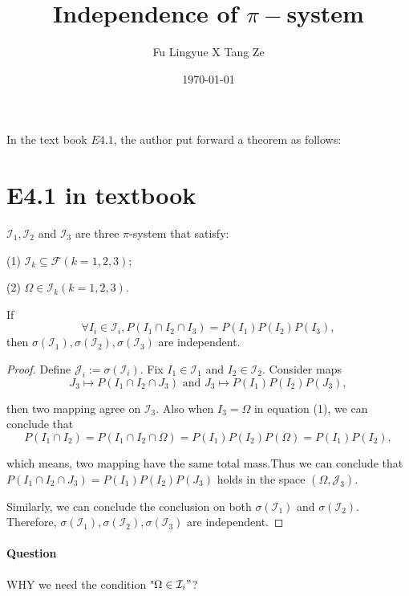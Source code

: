 

\title{Independence of $\pi-$system}
\author{Fu Lingyue X Tang Ze}
\date{\today}


\maketitle
In the text book $E4.1$, the author put forward a theorem as follows:
\section{E4.1 in textbook}
\begin{theorem}
  $\mathcal I_1,\mathcal I_2$ and $\mathcal I_3$ are three $\pi$-system that satisfy:
  
  (1) $\mathcal I_k\subseteq \mathcal F(k=1,2,3);$
  
  (2) $\Omega\in \mathcal I_k(k = 1,2,3).$
  
  If 
  \begin{equation}
    \forall I_i \in \mathcal I_i,P(I_1 \cap I_2\cap I_3) = P(I_1)P(I_2)P(I_3),
  \end{equation}
 then $\sigma(\mathcal I_1), \sigma(\mathcal I_2),\sigma(\mathcal I_3)$ are independent.
\end{theorem}
\begin{proof}
Define $\mathcal J_i := \sigma(\mathcal I_i).$
  Fix $I_1 \in \mathcal I_1$ and $I_2 \in \mathcal I_2$. Consider maps
  $$ J_3\mapsto P(I_1\cap I_2\cap J_3) \text{ and }  J_3\mapsto P(I_1)P(I_2)P(J_3),$$
  
 then two mapping agree on $\mathcal I_3$. Also when $I_3 = \Omega$ in equation (1), we can conclude that 
 $$P(I_1\cap I_2) = P(I_1\cap I_2\cap \Omega) = P(I_1)P(I_2)P(\Omega) = P(I_1)P(I_2),$$
 
 which means, two mapping have the same total mass.Thus we can conclude that $P(I_1\cap I_2\cap J_3)=P(I_1)P(I_2)P(J_3)$ holds in the space $(\Omega,\mathcal J_3).$ 
 
 Similarly, we can conclude the conclusion on both $\sigma(\mathcal I_1)$ and $\sigma(\mathcal I_2)$. Therefore, $\sigma(\mathcal I_1), \sigma(\mathcal I_2),\sigma(\mathcal I_3)$ are independent.
\end{proof}

\paragraph{Question} WHY we need the condition "$\Omega\in \mathcal I_i"$?

